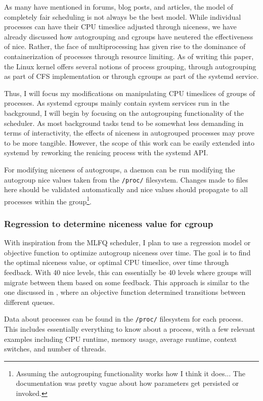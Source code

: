 \documentclass[12pt]{article}
\def\ind{\hspace*{0.3in}}
\begin{document}
\ind As many have mentioned in forums, blog posts, and articles, the model of completely fair scheduling is not always be the best model. While individual processes can have their CPU timeslice adjusted through niceness, we have already discussed how autogrouping and cgroups have neutered the effectiveness of nice. Rather, the face of multiprocessing has given rise to the dominance of containerization of processes through resource limiting. As of writing this paper, the Linux kernel offers several notions of process grouping, through autogrouping as part of CFS implementation or through cgroups as part of the systemd service. 

Thus, I will focus my modifications on manipulating CPU timeslices of groups of processes. As systemd cgroups mainly contain system services run in the background, I will begin by focusing on the autogrouping functionality of the scheduler. As most background tasks tend to be somewhat less demanding in terms of interactivity, the effects of niceness in autogrouped processes may prove to be more tangible. However, the scope of this work can be easily extended into systemd by reworking the renicing process with the systemd API.

For modifying niceness of autogroups, a daemon can be run modifying the autogroup nice values taken from the \texttt{/proc/} filesystem. Changes made to files here should be validated automatically and nice values should propagate to all processes within the group\footnote{Assuming the autogrouping functionality works how I think it does... The documentation was pretty vague about how parameters get persisted or invoked.}.


\subsubsection*{Regression to determine niceness value for cgroup}

\ind With inspiration from the MLFQ scheduler, I plan to use a regression model or objective function to optimize autogroup niceness over time. The goal is to find the optimal niceness value, or optimal CPU timeslice, over time through feedback. With 40 nice levels, this can essentially be 40 levels where groups will migrate between them based on some feedback. This approach is similar to the one discussed in \cite{rinkuReinforcementLearningBased2020}, where an objective function determined transitions between different queues.

Data about processes can be found in the \texttt{/proc/} filesystem for each process. This includes essentially everything to know about a process, with a few relevant examples including CPU runtime, memory usage, average runtime, context switches, and number of threads.
\end{document}
